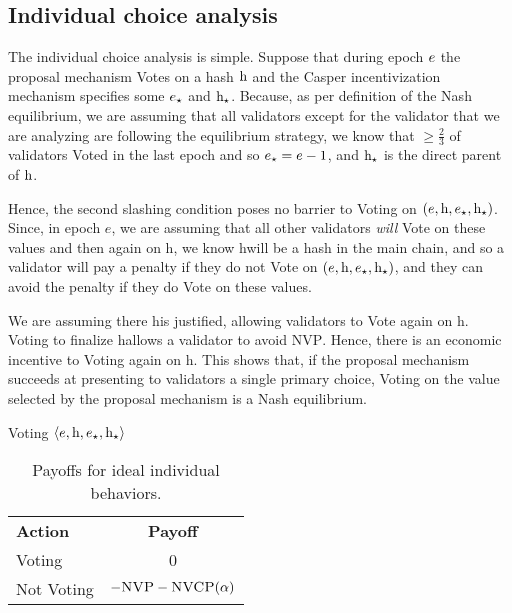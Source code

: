 \documentclass[12pt, final]{article}
\newcommand{\epoch}{\ensuremath{e}\space}
\newcommand{\hash}{\textnormal{h}\space}
\newcommand{\epochsource}{\ensuremath{\epoch_{\star}}\space}
\newcommand{\hashsource}{\ensuremath{\hash_{\star}}\space}
\newcommand{\NVP}{\textsc{NVP}\space}
\newcommand{\NVCP}{\textsc{NVCP}\space}
\begin{document}
\subsection{Individual choice analysis}
\label{sect:indivchoice}


The individual choice analysis is simple. Suppose that during epoch $\epoch$ the proposal mechanism Votes on a hash $\hash$ and the Casper incentivization mechanism specifies some $\epochsource$ and $\hashsource$. Because, as per definition of the Nash equilibrium, we are assuming that all validators except for the validator that we are analyzing are following the equilibrium strategy, we know that $\ge \frac{2}{3}$ of validators Voted in the last epoch and so $\epochsource = \epoch - 1$, and $\hashsource$ is the direct parent of $\hash$.

Hence, the second slashing condition poses no barrier to Voting on $(\epoch, \hash, \epochsource, \hashsource)$. Since, in epoch \epoch, we are assuming that all other validators \emph{will} Vote on these values and then again on \hash, we know \hash will be a hash in the main chain, and so a validator will pay a penalty if they do not Vote on $(\epoch, \hash, \epochsource, \hashsource)$, and they can avoid the penalty if they do Vote on these values.

We are assuming there \hash is justified, allowing validators to Vote again on \hash. Voting to finalize \hash allows a validator to avoid \NVP. Hence, there is an economic incentive to Voting again on \hash. This shows that, if the proposal mechanism succeeds at presenting to validators a single primary choice, Voting on the value selected by the proposal mechanism is a Nash equilibrium.


\begin{table}[h!bt]
	\centering
   
	Voting $\langle \epoch, \hash, \epochsource, \hashsource \rangle$
    { \begin{tabular}{l c}
	\textbf{Action} & \textbf{Payoff} \\
	Voting & 0 \\
	Not Voting & $-\NVP - \NVCP(\alpha)$ \\
	\end{tabular}} \hspace{0.5in}
	\caption{Payoffs for ideal individual behaviors.}
	\label{fig:individualpayoffs}
\end{table}
\end{document}
